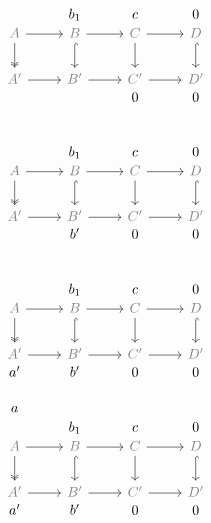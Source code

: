 \documentclass[12pt]{article}
\begin{document}
\begin{equation*}
  \begin{tikzcd}
    \phantom{a} & \phantom{b_2} & \phantom {0} \\[-2em]
    & b_1& c  & 0\\[-2em]
    \color{gray}A\rar\dar[two heads] & \color{gray}B\rar\dar[hook] & \color{gray}C\rar\dar & \color{gray}D\dar[hook] \\
    \color{gray}A'\rar &\color{gray} B'\rar &\color{gray} C'\rar &\color{gray} D' \\[-2em]
    &\phantom{b'} & 0 & 0
  \end{tikzcd}
\end{equation*}
 
\begin{equation*}
  \begin{tikzcd}
    \phantom{a} & \phantom{b_2} & \phantom 0 \\[-2em]
    & b_1& c  & 0\\[-2em]
    \color{gray}A\rar\dar[two heads] & \color{gray}B\rar\dar[hook] & \color{gray}C\rar\dar & \color{gray}D\dar[hook] \\
    \color{gray}A'\rar &\color{gray} B'\rar &\color{gray} C'\rar &\color{gray} D' \\[-2em]
    & b' & 0 & 0
  \end{tikzcd}
\end{equation*}

\begin{equation*}
  \begin{tikzcd}
    \phantom a & \phantom{b_2}& \phantom 0\\[-2em]
    & b_1& c  & 0\\[-2em]
    \color{gray}A\rar\dar[two heads] & \color{gray}B\rar\dar[hook] & \color{gray}C\rar\dar & \color{gray}D\dar[hook] \\
    \color{gray}A'\rar &\color{gray} B'\rar &\color{gray} C'\rar &\color{gray} D' \\[-2em]
    a' & b' & 0 & 0
  \end{tikzcd}
\end{equation*}

\begin{equation*}
  \begin{tikzcd}
    a & \phantom{b_2}&\phantom 0\\[-2em]
     & b_1& c  & 0\\[-2em]
    \color{gray}A\rar\dar[two heads, black] & \color{gray}B\rar\dar[hook] & \color{gray}C\rar\dar & \color{gray}D\dar[hook] \\
    \color{gray}A'\rar &\color{gray} B'\rar &\color{gray} C'\rar &\color{gray} D' \\[-2em]
    a' & b' & 0 & 0
  \end{tikzcd}
\end{equation*}
\end{document}
